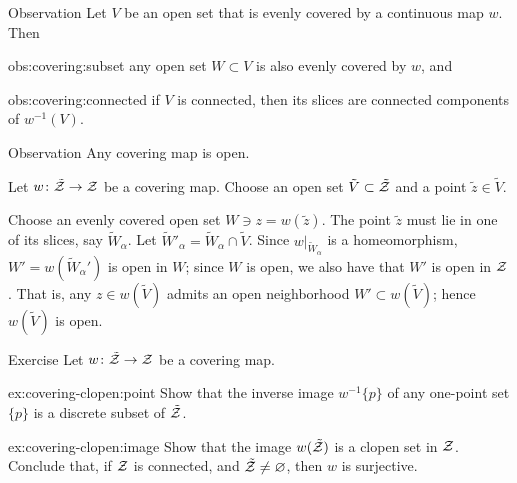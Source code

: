 \begin{thm}{Observation}\label{obs:covering}
Let $V$ be an open set that is evenly covered by a continuous map $w$.
Then

\begin{subthm}{obs:covering:subset}
any open set $W\subset V$ is also evenly covered by $w$, and
\end{subthm}

\begin{subthm}{obs:covering:connected}
if $V$ is connected, then its slices are connected components of $w^{-1}(V)$.
\end{subthm}

\end{thm}




\begin{thm}{Observation}\label{thm:covering-open}
Any covering map is open.
\end{thm}

Let $w\colon\tilde{\mathcal{Z}}\to \mathcal{Z}$ be a covering map.
Choose an open set $\tilde V\subset \tilde{\mathcal{Z}}$ and a point $\tilde z\in \tilde V$.

Choose an evenly covered open set $W\ni z=w(\tilde z)$.
The point $\tilde z$ must lie in one of its slices, say $\tilde W_\alpha$.
Let $\tilde W'_\alpha=\tilde W_\alpha\cap \tilde V$.
Since $w|_{\tilde W_\alpha}$ is a homeomorphism, $W'=w(\tilde W_\alpha')$ is open in $W$;
since $W$ is open, we also have that $W'$ is open in $\mathcal{Z}$.
That is, any $z\in w(\tilde V)$ admits an open neighborhood $W'\subset w(\tilde V)$;
hence $w(\tilde V)$ is open.
\qeds

\begin{thm}[!]{Exercise}\label{ex:covering-clopen}
Let $w\colon\tilde{\mathcal{Z}}\to\mathcal{Z}$ be a covering map.

\begin{subthm}{ex:covering-clopen:point}
Show that the inverse image $w^{-1}\{p\}$ of any one-point set $\{p\}$ is a discrete subset of $\tilde{\mathcal{Z}}$.
\end{subthm}


\begin{subthm}{ex:covering-clopen:image}
Show that the image $w(\tilde{\mathcal{Z}})$ is a clopen set in $\mathcal{Z}$.
Conclude that, if $\mathcal{Z}$ is connected, and $\tilde{\mathcal{Z}}\ne\varnothing$, then $w$ is surjective.
\end{subthm}

\end{thm}

